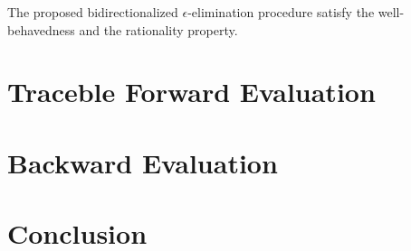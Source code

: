\documentclass{llncs}
\begin{document}
\begin{lemma}\label{lemma-well-epsilon}
The proposed bidirectionalized $\epsilon$-elimination procedure satisfy the well-behavedness and the rationality property.
\end{lemma}

\section{Traceble Forward Evaluation}\label{sec-fwd}


\section{Backward Evaluation}\label{sec-bak}

\section{Conclusion}\label{sec-con}
\end{document}
